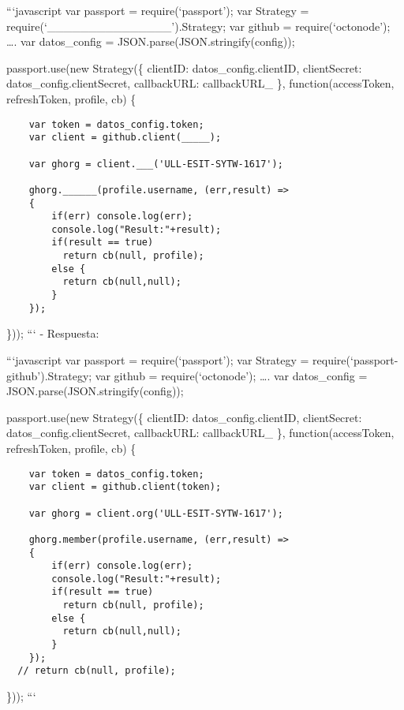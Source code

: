 ```javascript var passport = require(`passport'); var Strategy =
require(`\_\_\_\_\_\_\_\_\_\_\_\_\_\_\_').Strategy; var github =
require(`octonode'); \ldots{}. var datos\_config =
JSON.parse(JSON.stringify(config));

passport.use(new Strategy(\{ clientID: datos\_config.clientID,
clientSecret: datos\_config.clientSecret, callbackURL: callbackURL\_ \},
function(accessToken, refreshToken, profile, cb) \{

\begin{verbatim}
    var token = datos_config.token;
    var client = github.client(_____);

    var ghorg = client.___('ULL-ESIT-SYTW-1617');

    ghorg.______(profile.username, (err,result) =>
    {
        if(err) console.log(err);
        console.log("Result:"+result);
        if(result == true)
          return cb(null, profile);
        else {
          return cb(null,null);
        }
    });
\end{verbatim}

\})); ``` - Respuesta:

```javascript var passport = require(`passport'); var Strategy =
require(`passport-github').Strategy; var github = require(`octonode');
\ldots{}. var datos\_config = JSON.parse(JSON.stringify(config));

passport.use(new Strategy(\{ clientID: datos\_config.clientID,
clientSecret: datos\_config.clientSecret, callbackURL: callbackURL\_ \},
function(accessToken, refreshToken, profile, cb) \{

\begin{verbatim}
    var token = datos_config.token;
    var client = github.client(token);

    var ghorg = client.org('ULL-ESIT-SYTW-1617');

    ghorg.member(profile.username, (err,result) =>
    {
        if(err) console.log(err);
        console.log("Result:"+result);
        if(result == true)
          return cb(null, profile);
        else {
          return cb(null,null);
        }
    });
  // return cb(null, profile);
\end{verbatim}

\})); ```
